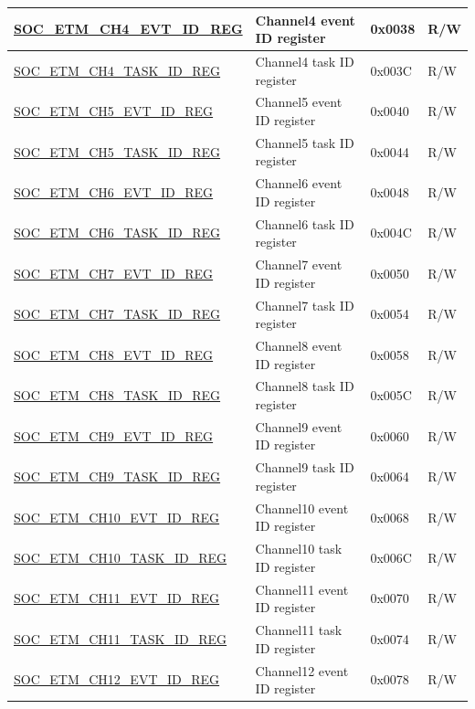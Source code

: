 \begin{longtable}{ | p{6cm} | p{6.4cm} | p{1.3cm} | p{1.8cm} | }
\hyperref[regdesc:SOCETMCH0EVTIDREG]{SOC\_ETM\_CH4\_EVT\_ID\_REG} & Channel4 event ID register & 0x0038 & R/W \\ \hline
\hyperref[regdesc:SOCETMCH0TASKIDREG]{SOC\_ETM\_CH4\_TASK\_ID\_REG} & Channel4 task ID register & 0x003C & R/W \\ \hline
\hyperref[regdesc:SOCETMCH0EVTIDREG]{SOC\_ETM\_CH5\_EVT\_ID\_REG} & Channel5 event ID register & 0x0040 & R/W \\ \hline
\hyperref[regdesc:SOCETMCH0TASKIDREG]{SOC\_ETM\_CH5\_TASK\_ID\_REG} & Channel5 task ID register & 0x0044 & R/W \\ \hline
\hyperref[regdesc:SOCETMCH0EVTIDREG]{SOC\_ETM\_CH6\_EVT\_ID\_REG} & Channel6 event ID register & 0x0048 & R/W \\ \hline
\hyperref[regdesc:SOCETMCH0TASKIDREG]{SOC\_ETM\_CH6\_TASK\_ID\_REG} & Channel6 task ID register & 0x004C & R/W \\ \hline
\hyperref[regdesc:SOCETMCH0EVTIDREG]{SOC\_ETM\_CH7\_EVT\_ID\_REG} & Channel7 event ID register & 0x0050 & R/W \\ \hline
\hyperref[regdesc:SOCETMCH0TASKIDREG]{SOC\_ETM\_CH7\_TASK\_ID\_REG} & Channel7 task ID register & 0x0054 & R/W \\ \hline
\hyperref[regdesc:SOCETMCH0EVTIDREG]{SOC\_ETM\_CH8\_EVT\_ID\_REG} & Channel8 event ID register & 0x0058 & R/W \\ \hline
\hyperref[regdesc:SOCETMCH0TASKIDREG]{SOC\_ETM\_CH8\_TASK\_ID\_REG} & Channel8 task ID register & 0x005C & R/W \\ \hline
\hyperref[regdesc:SOCETMCH0EVTIDREG]{SOC\_ETM\_CH9\_EVT\_ID\_REG} & Channel9 event ID register & 0x0060 & R/W \\ \hline
\hyperref[regdesc:SOCETMCH0TASKIDREG]{SOC\_ETM\_CH9\_TASK\_ID\_REG} & Channel9 task ID register & 0x0064 & R/W \\ \hline
\hyperref[regdesc:SOCETMCH0EVTIDREG]{SOC\_ETM\_CH10\_EVT\_ID\_REG} & Channel10 event ID register & 0x0068 & R/W \\ \hline
\hyperref[regdesc:SOCETMCH0TASKIDREG]{SOC\_ETM\_CH10\_TASK\_ID\_REG} & Channel10 task ID register & 0x006C & R/W \\ \hline
\hyperref[regdesc:SOCETMCH0EVTIDREG]{SOC\_ETM\_CH11\_EVT\_ID\_REG} & Channel11 event ID register & 0x0070 & R/W \\ \hline
\hyperref[regdesc:SOCETMCH0TASKIDREG]{SOC\_ETM\_CH11\_TASK\_ID\_REG} & Channel11 task ID register & 0x0074 & R/W \\ \hline
\hyperref[regdesc:SOCETMCH0EVTIDREG]{SOC\_ETM\_CH12\_EVT\_ID\_REG} & Channel12 event ID register & 0x0078 & R/W \\ \hline

\end{longtable}
